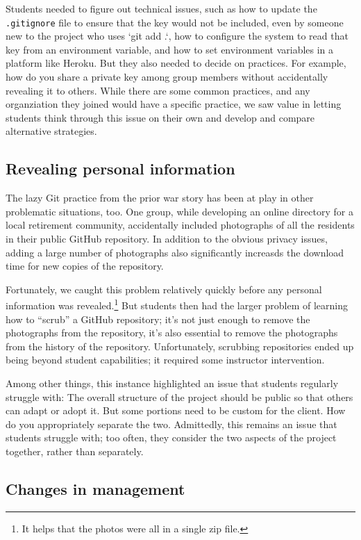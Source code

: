 Students needed to figure out technical issues, such as how
to update the \texttt{.gitignore} file to ensure that the key would
not be included, even by someone new to the project who uses `git
add .`, how to configure the system to read that key from an
environment variable, and how to set environment variables in a
platform like Heroku.  But they also needed to decide on practices.
For example, how do you share a private key among group members without
accidentally revealing it to others.  While there are some common practices,
and any organziation they joined would have a specific practice, we saw
value in letting students think through this issue on their own and
develop and compare alternative strategies.

\subsection{Revealing personal information}

The lazy Git practice from the prior war story has been at play
in other problematic situations, too.  One group, while developing
an online directory for a local retirement community, accidentally
included photographs of all the residents in their public GitHub
repository.  In addition to the obvious privacy issues, adding a
large number of photographs also significantly increasds the download
time for new copies of the repository.

Fortunately, we caught this problem relatively quickly before any
personal information was revealed.\footnote{It helps that the photos
were all in a single zip file.}  But students then had the larger
problem of learning how to ``scrub'' a GitHub repository; it's not
just enough to remove the photographs from the repository, it's
also essential to remove the photographs from the history of the
repository.  Unfortunately, scrubbing repositories ended up being
beyond student capabilities; it required some instructor intervention.

Among other things, this instance highlighted an issue that students
regularly struggle with: The overall structure of the project should
be public so that others can adapt or adopt it.  But some portions
need to be custom for the client.  How do you appropriately separate the
two.  Admittedly, this remains an issue that students struggle with;
too often, they consider the two aspects of the project together,
rather than separately.

\subsection{Changes in management}


